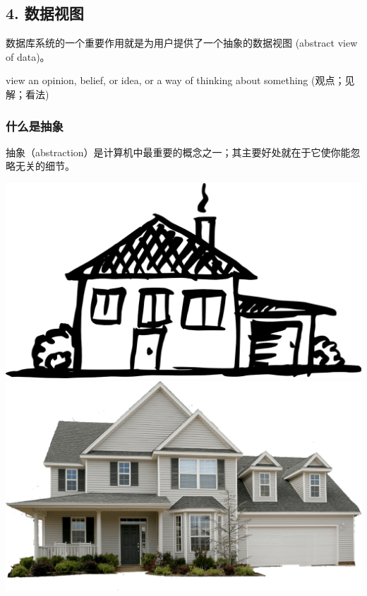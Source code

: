 \documentclass[aspectratio=169, 14pt]{beamer}
\begin{document}
\begin{frame}
    \section{\textcolor{darkmidnightblue}{4. 数据视图}} 
    数据库系统的一个重要作用就是为用户提供了一个\alert{抽象的数据视图} (abstract view of data)。

    \pause
    \begin{block}{view}
        an opinion, belief, or idea, or a way of thinking about something (观点；见解；看法)
    \end{block}
\end{frame}
\begin{frame}
    \frametitle{什么是抽象}    
抽象（abstraction）是计算机中最重要的概念之一；其主要好处就在于它使你能忽略无关的细节。

\includegraphics[width=.45\textwidth]{image/house.png}
\includegraphics[width=.45\textwidth]{image/home.png}
\end{frame}
\end{document}
